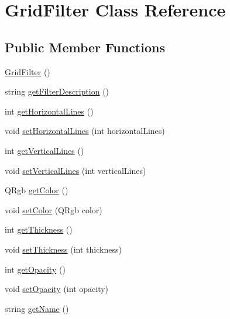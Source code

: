 \hypertarget{classModel_1_1Filter_1_1GridFilter}{}\section{Grid\+Filter Class Reference}
\label{classModel_1_1Filter_1_1GridFilter}
\subsection*{Public Member Functions}
\begin{DoxyCompactItemize}
\item 
\hyperlink{classModel_1_1Filter_1_1GridFilter_ab1ae2f8274ae2f189885458ea8107430}{Grid\+Filter} ()
\item 
string \hyperlink{classModel_1_1Filter_1_1GridFilter_a62b7b60e24f92234393b840b35808e06}{get\+Filter\+Description} ()
\item 
int \hyperlink{classModel_1_1Filter_1_1GridFilter_abcc18b0863e36589ecfc558674efac58}{get\+Horizontal\+Lines} ()
\item 
void \hyperlink{classModel_1_1Filter_1_1GridFilter_a849b1116004a7d70012a0b2b435a654d}{set\+Horizontal\+Lines} (int horizontal\+Lines)
\item 
int \hyperlink{classModel_1_1Filter_1_1GridFilter_ac85296b9435ef3afd4439122f5251e3e}{get\+Vertical\+Lines} ()
\item 
void \hyperlink{classModel_1_1Filter_1_1GridFilter_a19a37598a2c1297a657d072776eb0cda}{set\+Vertical\+Lines} (int vertical\+Lines)
\item 
Q\+Rgb \hyperlink{classModel_1_1Filter_1_1GridFilter_ae697defefbdf5f895406269b15758d91}{get\+Color} ()
\item 
void \hyperlink{classModel_1_1Filter_1_1GridFilter_ad858846447f303e473dc8004ef607666}{set\+Color} (Q\+Rgb color)
\item 
int \hyperlink{classModel_1_1Filter_1_1GridFilter_ab6b7bfb33162f992d1bb4e8d6699abef}{get\+Thickness} ()
\item 
void \hyperlink{classModel_1_1Filter_1_1GridFilter_ae2faef96ee1277d229d6b6988c66e6d3}{set\+Thickness} (int thickness)
\item 
int \hyperlink{classModel_1_1Filter_1_1GridFilter_a0c8618c617e65d5ab8400704bbc09ed1}{get\+Opacity} ()
\item 
void \hyperlink{classModel_1_1Filter_1_1GridFilter_a22b140225648b55b27f2330938ae4006}{set\+Opacity} (int opacity)
\item 
string \hyperlink{classModel_1_1Filter_1_1GridFilter_a11335e13e50af74108bf926dc1340b4b}{get\+Name} ()
\end{DoxyCompactItemize}
